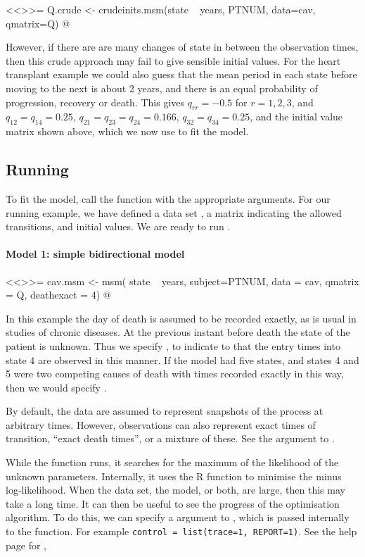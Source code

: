 <<>>=
Q.crude  <- crudeinits.msm(state ~ years, PTNUM, data=cav,
                                   qmatrix=Q)
@

However, if there are are many changes of state in between the
observation times, then this crude approach may fail to give sensible
initial values.  For the heart transplant example we could also guess
that the mean period in each state before moving to the next is about
2 years, and there is an equal probability of progression, recovery or
death.  This gives $q_{rr} = - 0.5$ for $r = 1, 2, 3$, and $q_{12} =
q_{14} = 0.25$, $q_{21} = q_{23} = q_{24} = 0.166$, $q_{32} = q_{34} =
0.25$, and the initial value matrix  shown above,
which we now use to fit the model.

\subsection{Running }
\label{sec:running}

To fit the model, call the  function with the appropriate
arguments.  For our running example, we have defined a data set
, a matrix  indicating the allowed
transitions, and initial values. We are ready to run .

\paragraph{Model 1: simple bidirectional model}


<<>>=
cav.msm <- msm( state ~ years, subject=PTNUM, data = cav,
                    qmatrix = Q, deathexact = 4)
@

In this example the day of death is assumed to be recorded exactly, as
is usual in studies of chronic diseases.  At the previous instant
before death the state of the patient is unknown.  Thus we specify
, to indicate to  that the
entry times into state 4 are observed in this manner.
If the model had
five states, and states 4 and 5 were two competing causes of death with
times recorded exactly in this way, then we would specify .

By default, the data are assumed to represent snapshots of the process
at arbitrary times.  However, observations can also represent exact
times of transition, ``exact death times'', or a mixture of these. See the
 argument to .  

While the  function runs, it searches for the maximum
of the likelihood of the unknown parameters.  Internally, it uses the
R function  to minimise the minus log-likelihood.
When the data set, the model, or both, are large, then this may take a
long time.  It can then be useful to see the progress of the
optimisation algorithm. To do this, we can specify a 
argument to , which is passed internally to the
 function.  For example \texttt{control = list(trace=1,
  REPORT=1)}. See the help page for ,

